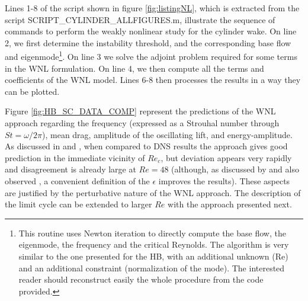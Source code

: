 \documentclass[twocolumn,10pt]{asme2ej}
\begin{document}
Lines 1-8 of the script shown in figure \ref{fig:listingNL}, which is extracted from the script 
{\sf SCRIPT\_CYLINDER\_ALLFIGURES.m}, illustrate the sequence of commands to 
perform the weakly nonlinear study for the cylinder wake.
On line 2, we first determine the instability threshold, and the corresponding base flow and eigenmode\footnote{This routine uses Newton iteration to directly compute the base flow, the eigenmode, the frequency and the critical Reynolds. The algorithm is very similar to the one presented for the HB, with an additional unknown (Re) and an additional constraint (normalization of the mode). The interested reader should reconstruct easily the whole procedure from the code provided.}. 
On line 3 we solve the adjoint problem required for some terms in the WNL formulation.
On line 4, we then compute all the terms and coefficients of the WNL model.
Lines 6-8 then processes the results in a way they can be plotted.




Figure \ref{fig:HB_SC_DATA_COMP} represent the predictions of the WNL approach regarding the frequency (expressed as a Strouhal number through $St = \omega/2\pi$), mean drag, amplitude of the oscillating lift, and energy-amplitude.
As discussed in \cite{SippLebedev} and \cite{FDR2016},  when compared to DNS results the approach gives good prediction in the immediate vicinity of $Re_c$, but deviation appears very rapidly and disagreement is already large at $Re=48$ (although, as discussed by \cite{FDR2016} and also observed  \cite{Tchoufag2015}, a convenient definition of the $\epsilon$ improves the results). 
 These aspects are justified by the perturbative nature of the WNL approach. The description of the limit cycle can be extended to larger $Re$ with the approach presented next.  
\end{document}
